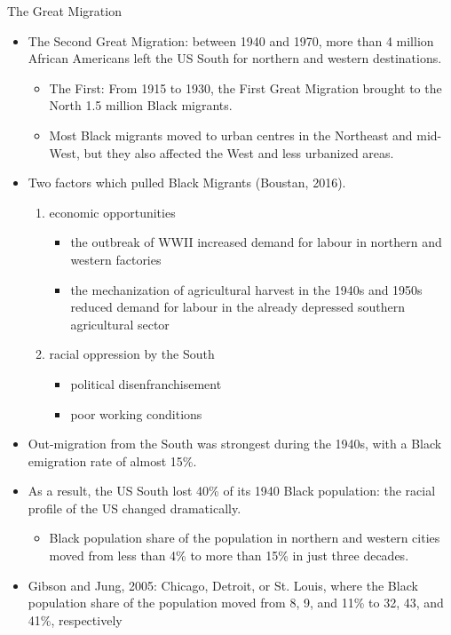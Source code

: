 \documentclass[dvipdfmx,11pt]{beamer}
\begin{document}
\begin{frame}{The Great Migration}
  \begin{itemize}
    \item The Second Great Migration: between 1940 and 1970, more than 4 million African Americans left the US South for northern and western destinations.
    \begin{itemize}
      \item The First: From 1915 to 1930, the First Great Migration brought to the North 1.5 million Black migrants.
      \item Most Black migrants moved to urban centres in the Northeast and mid-West, but they also affected the West and less urbanized areas.
    \end{itemize}
    \item Two factors which pulled Black Migrants (Boustan, 2016).
    \begin{enumerate}
      \item economic opportunities
      \begin{itemize}
        \item the outbreak of WWII increased demand for labour in northern and western factories
        \item the mechanization of agricultural harvest
        in the 1940s and 1950s reduced demand for labour in the already depressed southern agricultural sector
      \end{itemize}
      \item racial oppression by the South
      \begin{itemize}
        \item political disenfranchisement
        \item poor working conditions
      \end{itemize}
    \end{enumerate}
  \end{itemize}
\end{frame}

\begin{frame}{}
  \begin{itemize}
    \item Out-migration from the South was strongest during the 1940s, with a Black emigration rate of almost 15\%.
    \item As a result, the US South lost 40\% of its 1940 Black population: the racial profile of the US changed dramatically.
    \begin{itemize}
      \item Black population share of the population in northern and western cities moved from less than 4\% to more than 15\% in just three decades.
    \end{itemize}
    \item Gibson and Jung, 2005: Chicago, Detroit, or St. Louis, where the Black population share of the population moved from 8, 9, and 11\% to 32, 43, and 41\%, respectively 
  \end{itemize}
\end{frame}
\end{document}
